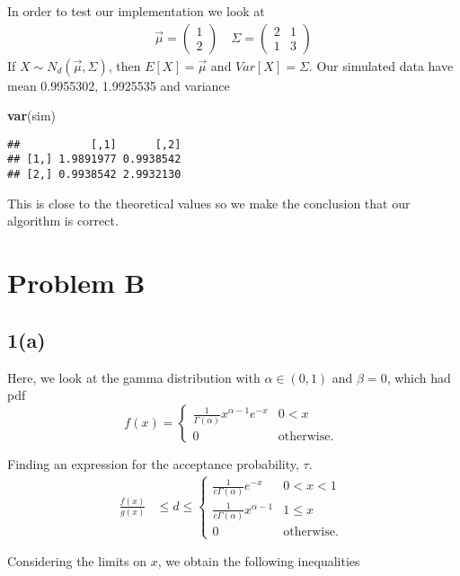 \documentclass[
]{article}
\newenvironment{Shaded}{\begin{snugshade}}{\end{snugshade}}
\newcommand{\KeywordTok}[1]{\textcolor[rgb]{0.13,0.29,0.53}{\textbf{#1}}}
\newcommand{\NormalTok}[1]{#1}
\begin{document}
In order to test our implementation we look at \[
\begin{aligned}
  \vec\mu = \begin{pmatrix}
    1 \\
    2
  \end{pmatrix} \quad 
  \Sigma = \begin{pmatrix}
    2 & 1 \\
    1 & 3
  \end{pmatrix}
\end{aligned}
\] If \(X\sim N_d(\vec\mu, \Sigma)\), then \(E[X]=\vec\mu\) and
\(Var[X]=\Sigma\). Our simulated data have mean 0.9955302, 1.9925535 and
variance

\begin{Shaded}
\begin{Highlighting}[]
\KeywordTok{var}\NormalTok{(sim)}
\end{Highlighting}
\end{Shaded}

\begin{verbatim}
##           [,1]      [,2]
## [1,] 1.9891977 0.9938542
## [2,] 0.9938542 2.9932130
\end{verbatim}

This is close to the theoretical values so we make the conclusion that
our algorithm is correct.

\hypertarget{problem-b}{%
\section{Problem B}\label{problem-b}}

\hypertarget{a-2}{%
\subsection{1(a)}\label{a-2}}

Here, we look at the gamma distribution with \(\alpha\in(0,1)\) and
\(\beta=0\), which had pdf \[
f(x)= \begin{cases} 
      \frac{1}{\Gamma(\alpha)}x^{\alpha-1}e^{-x} & 0< x\\
      0 & \text{otherwise. }
   \end{cases}
\]

Finding an expression for the acceptance probability, \(\tau\). \[
\begin{aligned}
\frac{f(x)}{g(x)}&\le d
\le \begin{cases} 
      \frac{1}{c\Gamma(\alpha)}e^{-x} & 0< x< 1 \\
      \frac{1}{c\Gamma(\alpha)}x^{\alpha -1} & 1\leq x \\
      0 & \text{otherwise. }
   \end{cases}\\ \\
\end{aligned}
\] Considering the limits on \(x\), we obtain the following inequalities
\end{document}
